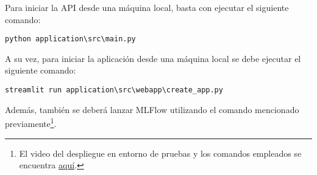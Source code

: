 Para iniciar la API desde una máquina local, basta con ejecutar el siguiente comando: \begin{verbatim}python application\src\main.py\end{verbatim}

A su vez, para iniciar la aplicación desde una máquina local se debe ejecutar el siguiente comando: \begin{verbatim}streamlit run application\src\webapp\create_app.py\end{verbatim}

Además, también se deberá lanzar MLFlow utilizando el comando mencionado previamente\footnote{El video del despliegue en entorno de pruebas y los comandos empleados se encuentra \href{https://youtu.be/1rctGi8Sb7Q}{aquí}.}.